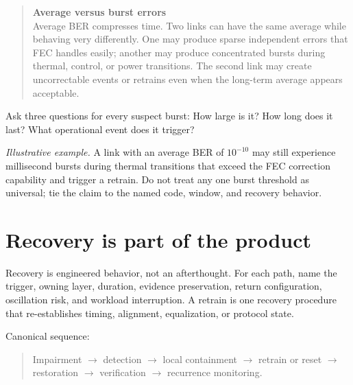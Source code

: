 \begin{quote}
\noindent\textbf{Average versus burst errors}\\[0.35em]
Average BER compresses time. Two links can have the same average while behaving
very differently. One may produce sparse independent errors that FEC handles
easily; another may produce concentrated bursts during thermal, control, or
power transitions. The second link may create uncorrectable events or retrains
even when the long-term average appears acceptable.
\end{quote}

Ask three questions for every suspect burst: How large is it? How long does it
last? What operational event does it trigger?

\textit{Illustrative example.} A link with an average BER of $10^{-10}$ may
still experience millisecond bursts during thermal transitions that exceed the
FEC correction capability and trigger a retrain. Do not treat any one burst
threshold as universal; tie the claim to the named code, window, and recovery
behavior.

\section{Recovery is part of the product}
\label{sec:ops-recovery}

Recovery is engineered behavior, not an afterthought. For each path, name the
trigger, owning layer, duration, evidence preservation, return configuration,
oscillation risk, and workload interruption. A retrain is
one recovery procedure that re-establishes timing, alignment, equalization, or
protocol state.

Canonical sequence:

\begin{quote}
\noindent Impairment
$\rightarrow$ detection
$\rightarrow$ local containment
$\rightarrow$ retrain or reset
$\rightarrow$ restoration
$\rightarrow$ verification
$\rightarrow$ recurrence monitoring.
\end{quote}

